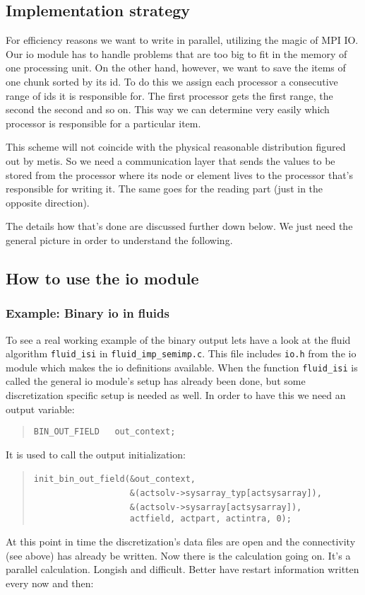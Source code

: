 \subsection{Implementation strategy}

For efficiency reasons we want to write in parallel, utilizing the
magic of MPI IO. Our io module has to handle problems that are too
big to fit in the memory of one processing unit. On the other hand,
however, we want to save the items of one chunk sorted by its id.
To do this we assign each processor a consecutive range of ids it
is responsible for. The first processor gets the first range, the
second the second and so on. This way we can determine very easily
which processor is responsible for a particular item.

This scheme will not coincide with the physical reasonable distribution
figured out by metis. So we need a communication layer that sends
the values to be stored from the processor where its node or element
lives to the processor that's responsible for writing it. The same
goes for the reading part (just in the opposite direction).

The details how that's done are discussed further down below. We just
need the general picture in order to understand the following.


\subsection{How to use the io module}


\subsubsection{Example: Binary io in fluids}

To see a real working example of the binary output lets have a look
at the fluid algorithm \texttt{fluid{\_}isi} in \texttt{fluid{\_}imp{\_}semimp.c}.
This file includes \texttt{io.h} from the io module which makes the
io definitions available. When the function \texttt{fluid{\_}isi}
is called the general io module's setup has already been done, but
some discretization specific setup is needed as well. In order to
have this we need an output variable: 

\begin{quote}
\texttt{BIN{\_}OUT{\_}FIELD~~~out{\_}context; }
\end{quote}
It is used to call the output initialization: 

\begin{quote}
\texttt{init{\_}bin{\_}out{\_}field({\&}out{\_}context,~}~\\
 \texttt{~~~~~~~~~~~~~~~~~~~{\&}(actsolv->sysarray{\_}typ{[}actsysarray]),~}~\\
 \texttt{~~~~~~~~~~~~~~~~~~~{\&}(actsolv->sysarray{[}actsysarray]),~}~\\
 \texttt{~~~~~~~~~~~~~~~~~~~actfield,~actpart,~actintra,~0); }
\end{quote}
At this point in time the discretization's data files are open and
the connectivity (see above) has already be written. Now there is
the calculation going on. It's a parallel calculation. Longish and
difficult. Better have restart information written every now and then: 

